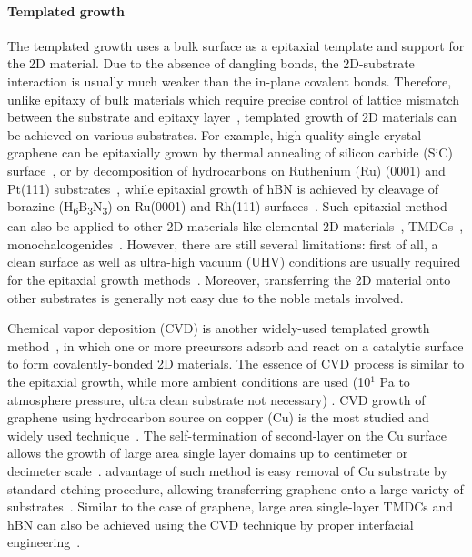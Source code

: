 \paragraph{Templated growth}
The templated growth uses a bulk surface as a epitaxial template and
support for the 2D material. Due to the absence of dangling bonds, the
2D-substrate interaction is usually much weaker than the in-plane
covalent bonds. Therefore, unlike epitaxy of bulk materials which
require precise control of lattice mismatch between the substrate and
epitaxy
layer~\cite{Koma_1985_vdWE,Ueno_1990_vdWE,Parkinson_1991_vdWE},
templated growth of 2D materials can be achieved on various
substrates. For example, high quality single crystal graphene can be
epitaxially grown by thermal annealing of silicon carbide (SiC)
surface~\cite{Berger_2004_sic,de_Heer_2007}, or by decomposition of
hydrocarbons on Ruthenium (Ru) (0001) and Pt(111)
substrates~\cite{Sutter_2008_gr_Ru,Sutter_2009_Gr_Pt}, while epitaxial
growth of hBN is achieved by cleavage of borazine
(H\textsubscript{6}B\textsubscript{3}N\textsubscript{3}) on Ru(0001)
and Rh(111)
surfaces~\cite{Goriachko_2007_assembl_hBN_ru,Goriachko_2008_AuNP_moire_hBN}.
%
Such epitaxial method can also be applied to other 2D materials like
elemental 2D
materials~\cite{Aufray_2010_silicene,Liu_2017_assemb_borophene},
TMDCs~\cite{Ugeda_2015_deposition},
monochalcogenides~\cite{Yang_2017_InSe}.
%
However, there are still several limitations: first of all, a clean
surface as well as ultra-high vacuum (UHV) conditions are usually
required for the epitaxial growth
methods~\cite{Liu_2018_rev}.
%
Moreover, transferring the 2D material
onto other substrates is generally not easy due to the noble metals
involved.
%

Chemical vapor deposition (CVD) is another widely-used templated
growth
method~\cite{Li_2016_cvd_rev,Novoselov_2016_vdW,Lin_2019_gr_rev_growth},
in which one or more precursors adsorb and react on a catalytic
surface to form covalently-bonded 2D materials.
%
The essence of CVD process is similar to the epitaxial growth, while
more ambient conditions are used (10$^{1}$ Pa to atmosphere pressure,
ultra clean substrate not necessary) \cite{Li_2016_cvd_rev}.
%
CVD growth of graphene using hydrocarbon source on copper (Cu) is the
most studied and widely used technique~\cite{Li_2016_cvd_rev}.
%
The self-termination of second-layer on the Cu surface allows the
growth of large area single layer domains up to centimeter or
decimeter
scale~\cite{Li_2011_single_crystal,Bae_2010_gr_roll,Xu_2017_gr_single_large}.
advantage of such method is easy removal of Cu substrate by standard
etching procedure, allowing transferring graphene onto a large variety
of substrates~\cite{Kim_2009_gr_transparent}.
%
Similar to the case of graphene, large area single-layer TMDCs and hBN
can also be achieved using the CVD technique by proper interfacial
engineering~\cite{Shi_2012_vdw_epi_MoS2_gr,Lee_2018_gold_BN}.
%

